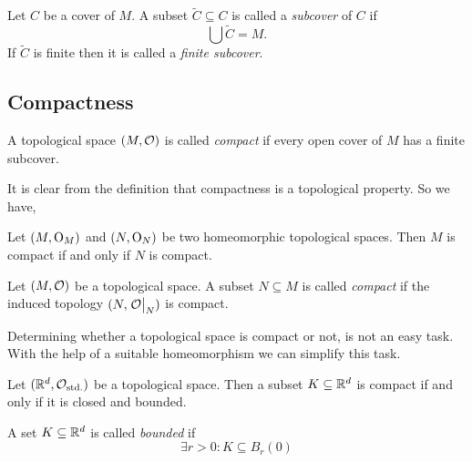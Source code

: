 \begin{definition}\label{def:subcover}
	Let \(C\) be a cover of \(M\). A subset \(\tilde{C} \subseteq C\) is called a \emph{subcover} of \(C\) if
	\begin{equation}
		\bigcup \tilde{C} = M. \label{eq:subcover}
	\end{equation}
	If \(\tilde{C}\) is finite then it is called a \emph{finite subcover}.
\end{definition}

\subsection{Compactness}
\begin{definition}\label{def:compact_space}
	A topological space \((M, \mathcal{O})\) is called \emph{compact} if every open cover of \(M\) has a finite subcover.
\end{definition}

It is clear from the definition that compactness is a topological property. So we have,
\begin{remark}
	Let \((M, \mathrm{O}_M)\) and \((N, \mathrm{O}_N)\) be two homeomorphic topological spaces. Then \(M\) is compact if and only if \(N\) is compact.
\end{remark}

\begin{definition}\label{def:compact_subset}
	Let \((M, \mathcal{O})\) be a topological space. A subset \(N \subseteq M\) is called \emph{compact} if the induced topology \((N, \eval{\CO}_N)\) is compact.
\end{definition}

Determining whether a topological space is compact or not, is not an easy task. With the help of a suitable homeomorphism we can simplify this task.

\begin{theorem}
	Let \((\mathbb R^d, \mathcal{O}_{\text{std.}})\) be a topological space. Then a subset \(K \subseteq \mathbb R^d\) is compact if and only if it is closed and bounded.
\end{theorem}

\begin{remark}
	A set \(K \subseteq \mathbb R^d\) is called \emph{bounded} if
	\begin{equation}
		\exists r > 0: K \subseteq B_r(0) \label{eq:bounded_set}
	\end{equation}
\end{remark}

